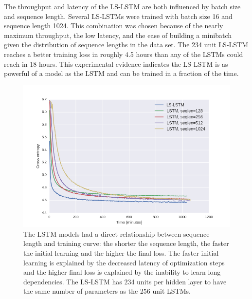 \documentclass{article}
\begin{document}
The throughput and latency of the LS-LSTM are both influenced by batch size and sequence length. Several LS-LSTMs were trained with batch size 16 and sequence length 1024. This combination was chosen because of the nearly maximum throughput, the low latency, and the ease of building a minibatch given the distribution of sequence lengths in the data set. The 234 unit LS-LSTM reaches a better training loss in roughly 4.5 hours than any of the LSTMs could reach in 18 hours. This experimental evidence indicates the LS-LSTM is as powerful of a model as the LSTM and can be trained in a fraction of the time.

\begin{figure}[t]
\centering
\includegraphics[width=12cm]{lc2.png}
\caption{The LSTM models had a direct relationship between sequence length and training curve: the shorter the sequence length, the faster the initial learning and
the higher the final loss. The faster initial learning is explained by the decreased
latency of optimization steps and the higher final loss is explained by the
inability to learn long dependencies. The LS-LSTM has 234 units per hidden
layer to have the same number of parameters as the 256 unit LSTMs.}
\label{fig:learning_curves}
\end{figure}
\end{document}
